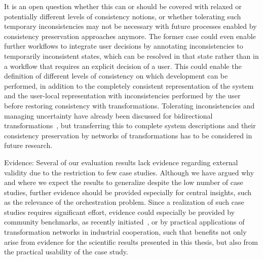 \begin{properdescription}
It is an open question whether this can or should be covered with relaxed or potentially different levels of consistency notions, or whether tolerating such temporary inconsistencies may not be necessary with future processes enabled by consistency preservation approaches anymore.
The former case could even enable further workflows to integrate user decisions by annotating inconsistencies to temporarily inconsistent states, which can be resolved in that state rather than in a workflow that requires an explicit decision of a user.
This could enable the definition of different levels of consistency on which development can be performed, in addition to the completely consistent representation of the system and the user-local representation with inconsistencies performed by the user before restoring consistency with transformations.
Tolerating inconsistencies and managing uncertainty have already been discussed for bidirectional transformations~\cite{eramo2015uncertainty-SLE,stevens2014Partial-FASE,diskin2016UncertaintyBidirectionalTransformations-BX}, but transferring this to complete system descriptions and their consistency preservation by networks of transformations has to be considered in future research.
\item[Evidence:]
Several of our evaluation results lack evidence regarding external validity due to the restriction to few case studies.
Although we have argued why and where we expect the results to generalize despite the low number of case studies, further evidence should be provided especially for central insights, such as the relevance of the orchestration problem.
Since a realization of such case studies requires significant effort, evidence could especially be provided by community benchmarks, as recently initiated~\cite{anjorin2019bxBenchmark-SoSym}, or by practical applications of transformation networks in industrial cooperation, such that benefits not only arise from evidence for the scientific results presented in this thesis, but also from the practical usability of the case study.
\end{properdescription}






